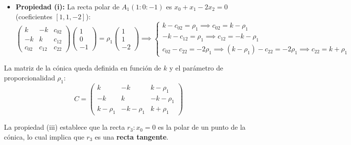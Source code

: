 {\begin{itemize}
    \item \textbf{Propiedad (i):} La recta polar de $A_1(1:0:-1)$ es $x_0 + x_1 - 2x_2 = 0$ (coeficientes $[1,1,-2]$):
    \[
    \begin{pmatrix} k & -k & c_{02} \\ -k & k & c_{12} \\ c_{02} & c_{12} & c_{22} \end{pmatrix} \begin{pmatrix} 1 \\ 0 \\ -1 \end{pmatrix} = \rho_1 \begin{pmatrix} 1 \\ 1 \\ -2 \end{pmatrix} \implies
    \begin{cases} 
    k - c_{02} = \rho_1 \implies c_{02} = k - \rho_1 \\ 
    -k - c_{12} = \rho_1 \implies c_{12} = -k - \rho_1 \\
    c_{02} - c_{22} = -2\rho_1 \implies (k - \rho_1) - c_{22} = -2\rho_1 \implies c_{22} = k + \rho_1
    \end{cases}
    \]
\end{itemize}

La matriz de la cónica queda definida en función de $k$ y el parámetro de proporcionalidad $\rho_1$:
\[
C = \begin{pmatrix} 
k & -k & k-\rho_1 \\ 
-k & k & -k-\rho_1 \\ 
k-\rho_1 & -k-\rho_1 & k+\rho_1 
\end{pmatrix}
\]



La propiedad (iii) establece que la recta $r_3: x_0 = 0$ es la polar de un punto de la cónica, lo cual implica que $r_3$ es una \textbf{recta tangente}. 

}
